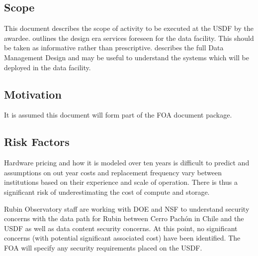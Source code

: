 \subsection{Scope}
\label{sect:scope}

This document describes the scope of activity to be executed at the \gls{USDF} 
by the awardee.  outlines the design era services foreseen for 
the data facility. This should be taken as informative rather than prescriptive.
 describes the full \gls{Data Management} Design and may be 
useful to understand the systems which will be deployed in the data facility.

\subsection{Motivation}
It is assumed this document will form part of the \gls{FOA} document package.

\subsection{Risk Factors}

Hardware pricing and how it is modeled over ten years is difficult to predict 
and assumptions on out year costs and replacement frequency vary between
institutions based on their experience and scale of operation. There is thus a 
significant risk of underestimating the cost of compute and storage.

Rubin Observatory staff are working with DOE and NSF to understand security concerns with the data path for Rubin between Cerro Pach\'{o}n in Chile and the \gls{USDF} as well as data content security concerns. At this point, no significant concerns (with potential significant associated cost) have been identified. The FOA will specify any security requirements placed on the \gls{USDF}.

